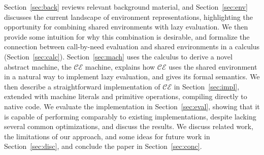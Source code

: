 Section~\ref{sec:back} reviews relevant background material, and
Section~\ref{sec:env} discusses the current landscape of environment
representations, highlighting the opportunity for combining shared environments
with lazy evaluation.  We then provide some intuition for why this combination
is desirable, and formalize the connection between call-by-need evaluation and
shared environments in a calculus (Section~\ref{sec:calc}).
Section~\ref{sec:mach} uses the calculus to derive a novel abstract machine, the
$\mathcal{CE}$ machine, explains how $\mathcal{CE}$ uses the shared environment
in a natural way to implement lazy evaluation, and gives its formal semantics.
We then describe a straightforward implementation of $\mathcal{CE}$ in
Section~\ref{sec:impl}, extended with machine literals and primitive operations,
compiling directly to native code. We evaluate the implementation in
Section~\ref{sec:eval}, showing that it is capable of performing comparably to
existing implementations, despite lacking several common optimizations, and
discuss the results. We discuss related work, the limitations of our approach,
and some ideas for future work in Section~\ref{sec:disc}, and conclude the
paper in Section~\ref{sec:conc}.


